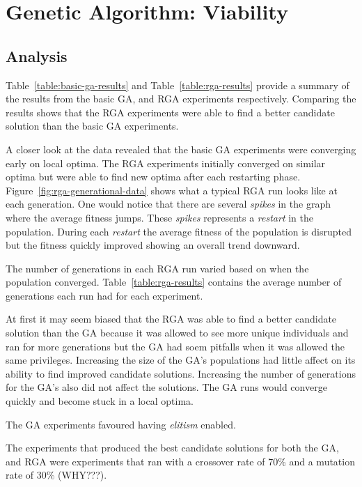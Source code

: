 \section{Genetic Algorithm: Viability}

\subsection{Analysis}

Table~\ref{table:basic-ga-results} and Table~\ref{table:rga-results} provide a summary of the results from the basic GA, and RGA experiments respectively. Comparing the results shows that the RGA experiments were able to find a better candidate solution than the basic GA experiments. 

A closer look at the data revealed that the basic GA experiments were converging early on local optima. The RGA experiments initially converged on similar optima but were able to find new optima after each restarting phase. Figure~\ref{fig:rga-generational-data} shows what a typical RGA run looks like at each generation. One would notice that there are several \textit{spikes} in the graph where the average fitness jumps. These \textit{spikes} represents a \textit{restart} in the population. During each \textit{restart} the average fitness of the population is disrupted but the fitness quickly improved showing an overall trend downward.

The number of generations in each RGA run varied based on when the population converged. Table~\ref{table:rga-results} contains the average number of generations each run had for each experiment.

At first it may seem biased that the RGA was able to find a better candidate solution than the GA because it was allowed to see more unique individuals and ran for more generations but the GA had soem pitfalls when it was allowed the same privileges. Increasing the size of the GA's populations had little affect on its ability to find improved candidate solutions. Increasing the number of generations for the GA's also did not affect the solutions. The GA runs would converge quickly and become stuck in a local optima.

The GA experiments favoured having \textit{elitism} enabled.

The experiments that produced the best candidate solutions for both the GA, and RGA were experiments that ran with a crossover rate of 70\% and a mutation rate of 30\% (WHY???).

